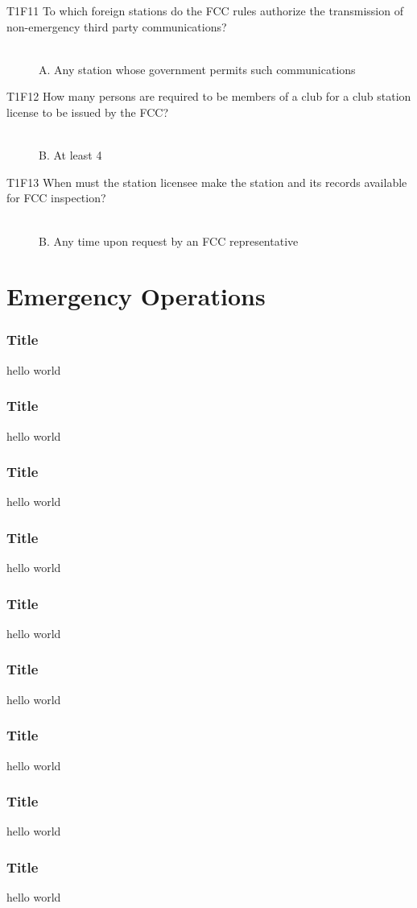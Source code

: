 \documentclass[10pt]{beamer}
\begin{document}
\begin{frame}
\begin{description}
\item[T1F11 To which foreign stations do the FCC rules authorize the transmission of non-emergency third party communications?] \hfil\\A. Any station whose government permits such communications
\item[T1F12 How many persons are required to be members of a club for a club station license to be issued by the FCC?] \hfil\\B. At least 4
\item[T1F13 When must the station licensee make the station and its records available for FCC inspection?]\hfil\\ B. Any time upon request by an FCC representative
\end{description}
\end{frame}

\section{Emergency Operations}
\begin{frame}
\frametitle{Title}
hello world
\end{frame}

\begin{frame}
\frametitle{Title}
hello world
\end{frame}

\begin{frame}
\frametitle{Title}
hello world
\end{frame}

\begin{frame}
\frametitle{Title}
hello world
\end{frame}

\begin{frame}
\frametitle{Title}
hello world
\end{frame}

\begin{frame}
\frametitle{Title}
hello world
\end{frame}

\begin{frame}
\frametitle{Title}
hello world
\end{frame}

\begin{frame}
\frametitle{Title}
hello world
\end{frame}

\begin{frame}
\frametitle{Title}
hello world
\end{frame}
\end{document}
